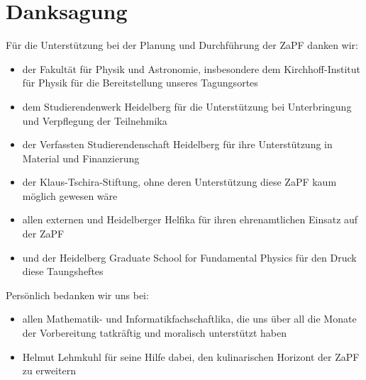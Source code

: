 
\section{Danksagung}
Für die Unterstützung bei der Planung und Durchführung der ZaPF danken wir:
\begin{itemize}
\item der Fakultät für Physik und Astronomie, insbesondere dem Kirchhoff-Institut für Physik für die Bereitstellung unseres Tagungsortes
\item dem Studierendenwerk Heidelberg für die Unterstützung bei Unterbringung und Verpflegung der Teilnehmika
\item der Verfassten Studierendenschaft Heidelberg für ihre Unterstützung in Material und Finanzierung
\item der Klaus-Tschira-Stiftung, ohne deren Unterstützung diese ZaPF kaum möglich gewesen wäre
\item allen externen und Heidelberger Helfika für ihren ehrenamtlichen Einsatz auf der ZaPF
\item und der Heidelberg Graduate School for Fundamental Physics für den Druck diese Taungsheftes
\end{itemize}
 Persönlich bedanken wir uns bei:
 \begin{itemize}
 \item allen Mathematik- und Informatikfachschaftlika, die uns über all die Monate der Vorbereitung tatkräftig und moralisch unterstützt haben
 \item Helmut Lehmkuhl für seine Hilfe dabei, den kulinarischen Horizont der ZaPF zu erweitern
 \end{itemize}
 

